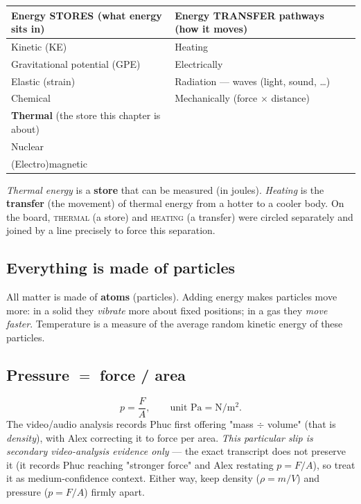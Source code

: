 \documentclass[11pt,a4paper]{article}
\begin{document}
\begin{center}
\renewcommand{\arraystretch}{1.25}
\begin{tabular}{@{}p{7.3cm}p{7.3cm}@{}}
\toprule
\textbf{Energy STORES (what energy sits in)} & \textbf{Energy TRANSFER pathways (how it moves)} \\
\midrule
Kinetic (KE) & Heating \\
Gravitational potential (GPE) & Electrically \\
Elastic (strain) & Radiation --- waves (light, sound, \ldots) \\
Chemical & Mechanically (force $\times$ distance) \\
\textbf{Thermal} (the store this chapter is about) & \\
Nuclear & \\
(Electro)magnetic & \\
\bottomrule
\end{tabular}
\end{center}

\begin{keybox}
\emph{Thermal energy} is a \textbf{store} that can be measured (in joules). \emph{Heating}
is the \textbf{transfer} (the movement) of thermal energy from a hotter to a cooler body.
On the board, \textsc{thermal} (a store) and \textsc{heating} (a transfer) were circled
separately and joined by a line precisely to force this separation.
\end{keybox}

\subsection{Everything is made of particles}
All matter is made of \textbf{atoms} (particles). Adding energy makes particles move more:
in a solid they \emph{vibrate} more about fixed positions; in a gas they \emph{move
faster}. Temperature is a measure of the average random kinetic energy of these particles.

\subsection{Pressure $=$ force / area}
\[
p = \frac{F}{A}, \qquad \text{unit } \si{\pascal} = \si{\newton\per\metre\squared}.
\]
The video/audio analysis records Phuc first offering "mass $\div$ volume" (that is
\emph{density}), with Alex correcting it to force per area. \emph{This particular slip is
secondary video-analysis evidence only} --- the exact transcript does not preserve it (it
records Phuc reaching "stronger force" and Alex restating $p=F/A$), so treat it as
medium-confidence context. Either way, keep density ($\rho = m/V$) and pressure ($p = F/A$)
firmly apart.
\end{document}
